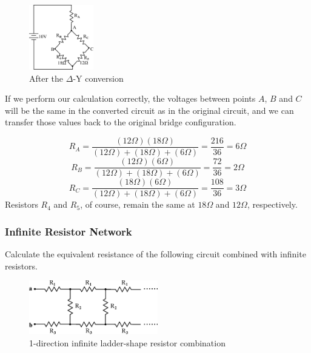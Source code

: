 \documentclass[a4 paper]{article}
\numberwithin{equation}{section}
\newcommand{\0}{\mathbf{0}}
\begin{document}
\begin{figure}[!ht]
  \caption{After the $\Delta$-Y conversion}
  \centering
  \includegraphics[width=0.25\textwidth,height=0.17\textheight]{./images/equ_resis4}
\end{figure}

If we perform our calculation correctly, the voltages between points $A$, $B$ and $C$ will be the same in the converted circuit as in the original circuit, and we can transfer those values back to the original bridge configuration.


\begin{equation}
R_{A} = \frac{(12\Omega)(18\Omega)}{(12\Omega)+(18\Omega)+(6\Omega)} = \frac{216}{36} = 6\Omega
\end{equation}
\begin{equation}
R_{B} = \frac{(12\Omega)(6\Omega)}{(12\Omega)+(18\Omega)+(6\Omega)} = \frac{72}{36} = 2\Omega
\end{equation}
\begin{equation}
R_{C} = \frac{(18\Omega)(6\Omega)}{(12\Omega)+(18\Omega)+(6\Omega)} = \frac{108}{36} = 3\Omega
\end{equation}
Resistors $R_4$ and $R_5$, of course, remain the same at $18\Omega$ and $12\Omega$, respectively. 


\subsubsection{Infinite Resistor Network}
Calculate the equivalent resistance of the following circuit combined with infinite resistors.

\begin{figure}[!ht]
  \caption{1-direction infinite ladder-shape resistor combination}
  \centering
  \includegraphics[width=0.5\textwidth]{./images/equ_resisinf1}
\end{figure}
\end{document}
